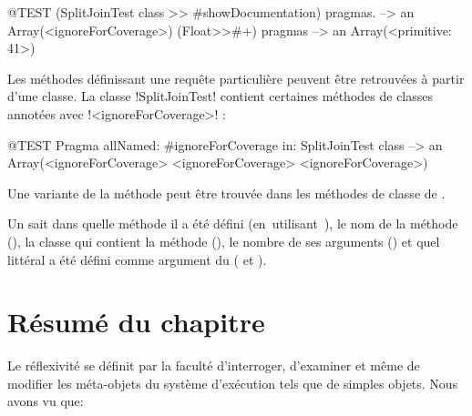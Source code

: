 \documentclass[a4paper,10pt,twoside]{book}
\begin{document}
\begin{code}{@TEST}
(SplitJoinTest class >> #showDocumentation) pragmas. --> an Array(<ignoreForCoverage>)
(Float>>#+) pragmas --> an Array(<primitive: 41>)
\end{code}

Les méthodes définissant une requête particulière peuvent être retrouvées à partir d'une classe. La classe \ct!SplitJoinTest! contient certaines méthodes de classes annotées avec \ct!<ignoreForCoverage>! :

\begin{code}{@TEST}
Pragma allNamed: #ignoreForCoverage in: SplitJoinTest class  --> an Array(<ignoreForCoverage> <ignoreForCoverage> <ignoreForCoverage>)
\end{code}

Une variante de la méthode  peut être trouvée dans les méthodes de classe de .

Un \pragma sait dans quelle méthode il a été défini \mbox{(en utilisant )}, le nom de la méthode (), la classe qui contient la méthode \mbox{()}, le nombre de ses arguments () et quel littéral a été défini comme argument du \pragma ( et ).


\section{Résumé du chapitre}

Le réflexivité se définit par la faculté d'interroger, d'examiner et même de modifier les méta-objets du système d'exécution tels que de simples objets. Nous avons vu que:
\end{document}
